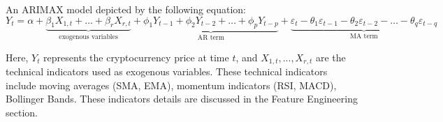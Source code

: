 \documentclass{ieeeojies}
\begin{document}

An ARIMAX model depicted by the following equation:
\begin{dmath*}
    Y_t = \alpha
    + \underbrace{\beta_1 X_{1,t} + \ldots + \beta_r X_{r,t}}_{\text{exogenous variables}}
    + \underbrace{\phi_1 Y_{t-1} + \phi_2 Y_{t-2} + \ldots + \phi_p Y_{t-p}}_{\text{AR term}}
    + \underbrace{\varepsilon_t - \theta_1 \varepsilon_{t-1} - \theta_2 \varepsilon_{t-2} - \ldots - \theta_q \varepsilon_{t-q}}_{\text{MA term}}
\end{dmath*}

Here, \(Y_t\) represents the cryptocurrency price at time \(t\), and \(X_{1,t},\)...\(,X_{r,t}\) are the technical indicators used as exogenous variables. These technical indicators include moving averages (SMA, EMA), momentum indicators (RSI, MACD), Bollinger Bands. These indicators details are discussed in the Feature Engineering section.
\end{document}
